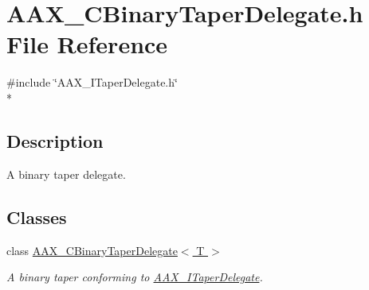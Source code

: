 \hypertarget{a00167}{}\section{A\+A\+X\+\_\+\+C\+Binary\+Taper\+Delegate.\+h File Reference}
\label{a00167}
{\ttfamily \#include \char`\"{}A\+A\+X\+\_\+\+I\+Taper\+Delegate.\+h\char`\"{}}\\*


\subsection{Description}
A binary taper delegate. 

\subsection*{Classes}
\begin{DoxyCompactItemize}
\item 
class \hyperlink{a00013}{A\+A\+X\+\_\+\+C\+Binary\+Taper\+Delegate$<$ T $>$}
\begin{DoxyCompactList}\small\item\em A binary taper conforming to \hyperlink{a00114}{A\+A\+X\+\_\+\+I\+Taper\+Delegate}. \end{DoxyCompactList}\end{DoxyCompactItemize}
